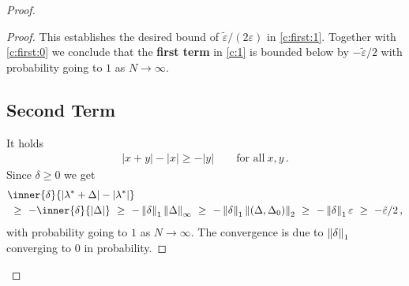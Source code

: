 \begin{proof}
\begin{proof}
This establishes the desired bound of 
$
\tilde{\varepsilon}/(2\varepsilon)
$
in \eqref{c:first:1}.
Together with \eqref{c:first:0}
we conclude that the \textbf{first term} 
in
\eqref{c:1}
is bounded below by
$
-
\tilde{\varepsilon}/2
$
with probability going to $1$ as $N\to\infty$.
\subsection*{Second Term}
It holds
\begin{gather*}
  |x+y|-|x|\ge
  -|y|
  \qquad
  \text{for all}\ 
  x,y
  \,.
\end{gather*}
Since
$\delta\ge 0$
we get
\begin{align*}
  &
     \inner
     {\delta}
     {
       |\lambda^*+\Delta|
       -
       |\lambda^*|
     }
     \\
     &
     \ 
     \ge
     \ 
     -
     \inner{\delta}
     {|\Delta|}
     \ 
     \ge
     \ 
     -
     \norm{\delta}_1
     \norm{\Delta}_\infty
     \ 
     \ge
     \ 
     -
     \norm{\delta}_1
     \norm{(\Delta,\Delta_0)}_2
     \ 
     \ge
     \ 
     -
     \norm{\delta}_1
     \varepsilon
     \ 
     \ge
     \ 
     -
     \tilde{\varepsilon}/2
     \,,
\end{align*}
with probability going to $1$ as $N\to \infty$.
The convergence is due to $\left\lVert\delta\right\rVert_1$ converging to $0$ in probability.

\end{proof}
\end{proof}
